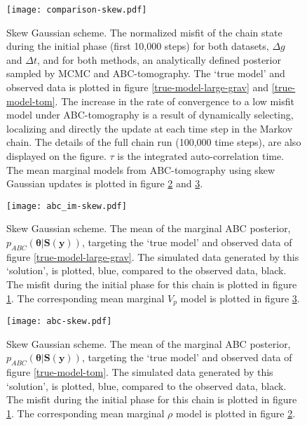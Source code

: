 \begin{figure}[H]
	\centering
	\texttt{[image: comparison-skew.pdf]}
	\caption{Skew Gaussian scheme. The normalized misfit of the chain state during the initial phase (first 10,000 steps) for both datasets, $\Delta g$ and $\Delta t$, and for both methods, an analytically defined posterior sampled by MCMC and ABC-tomography. The `true model' and observed data is plotted in figure \ref{true-model-large-grav} and \ref{true-model-tom}. The increase in the rate of convergence to a low misfit model under ABC-tomography is a result of dynamically selecting, localizing and directly the update at each time step in the Markov chain. The details of the full chain run (100,000 time steps), are also displayed on the figure. $\tau$ is the integrated auto-correlation time. The mean marginal models from ABC-tomography using skew Gaussian updates is plotted in figure \ref{grav-skew} and \ref{tom-skew}.}
	\label{comparison-skew}
\end{figure}

\begin{figure}[H]
	\centering
	\texttt{[image: abc\_im-skew.pdf]}
	\caption{Skew Gaussian scheme. The mean of the marginal ABC posterior, $p_{ABC}(\bm{\theta}|\bm{S}(\bm{y}))$, targeting the `true model' and observed data of figure \ref{true-model-large-grav}. The simulated data generated by this `solution', is plotted, blue, compared to the observed data, black. The misfit during the initial phase for this chain is plotted in figure \ref{comparison-skew}. The corresponding mean marginal $V_p$ model is plotted in figure \ref{tom-skew}.}
	\label{grav-skew}
\end{figure}

\begin{figure}[H]
	\centering
	\texttt{[image: abc-skew.pdf]}
	\caption{Skew Gaussian scheme. The mean of the marginal ABC posterior, $p_{ABC}(\bm{\theta}|\bm{S}(\bm{y}))$, targeting the `true model' and observed data of figure \ref{true-model-tom}. The simulated data generated by this `solution', is plotted, blue, compared to the observed data, black. The misfit during the initial phase for this chain is plotted in figure \ref{comparison-skew}. The corresponding mean marginal $\rho$ model is plotted in figure \ref{grav-skew}.}
	\label{tom-skew}
\end{figure}
